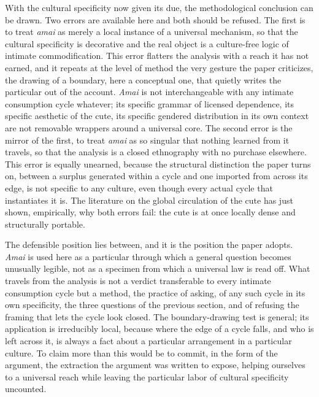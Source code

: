 \documentclass[11pt,a4paper]{article}
\begin{document}
With the cultural specificity now given its due, the methodological conclusion can be drawn. Two errors are available here and both should be refused. The first is to treat \textit{amai} as merely a local instance of a universal mechanism, so that the cultural specificity is decorative and the real object is a culture-free logic of intimate commodification. This error flatters the analysis with a reach it has not earned, and it repeats at the level of method the very gesture the paper criticizes, the drawing of a boundary, here a conceptual one, that quietly writes the particular out of the account. \textit{Amai} is not interchangeable with any intimate consumption cycle whatever; its specific grammar of licensed dependence, its specific aesthetic of the cute, its specific gendered distribution in its own context are not removable wrappers around a universal core. The second error is the mirror of the first, to treat \textit{amai} as so singular that nothing learned from it travels, so that the analysis is a closed ethnography with no purchase elsewhere. This error is equally unearned, because the structural distinction the paper turns on, between a surplus generated within a cycle and one imported from across its edge, is not specific to any culture, even though every actual cycle that instantiates it is. The literature on the global circulation of the cute has just shown, empirically, why both errors fail: the cute is at once locally dense and structurally portable.

The defensible position lies between, and it is the position the paper adopts. \textit{Amai} is used here as a particular through which a general question becomes unusually legible, not as a specimen from which a universal law is read off. What travels from the analysis is not a verdict transferable to every intimate consumption cycle but a method, the practice of asking, of any such cycle in its own specificity, the three questions of the previous section, and of refusing the framing that lets the cycle look closed. The boundary-drawing test is general; its application is irreducibly local, because where the edge of a cycle falls, and who is left across it, is always a fact about a particular arrangement in a particular culture. To claim more than this would be to commit, in the form of the argument, the extraction the argument was written to expose, helping ourselves to a universal reach while leaving the particular labor of cultural specificity uncounted.
\end{document}

